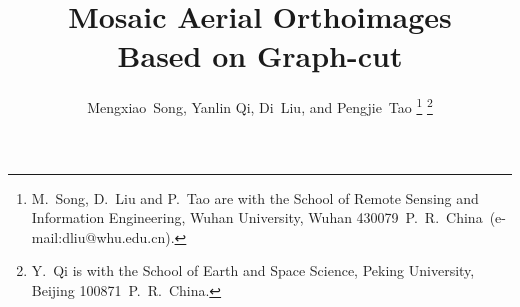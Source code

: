 \documentclass[journal]{IEEEtran}
\begin{document}
%
\title{Mosaic Aerial Orthoimages\\ Based on Graph-cut}
%
%
%

\author{Mengxiao~Song, Yanlin Qi, Di~Liu, and Pengjie~Tao%
\thanks{M.~Song, D.~Liu and P.~Tao are with the School of Remote Sensing and Information Engineering, Wuhan University, Wuhan 430079~P.~R.~China~(e-mail:dliu@whu.edu.cn).}%
\thanks{Y.~Qi is with the School of Earth and Space Science, Peking University, Beijing 100871~P.~R.~China.}%
}

%
%
\end{document}
